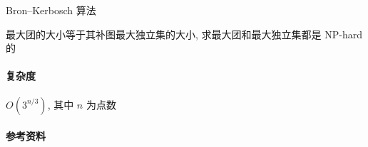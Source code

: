 Bron--Kerbosch 算法

最大团的大小等于其补图最大独立集的大小, 求最大团和最大独立集都是 NP-hard 的

\paragraph{复杂度} \(O\left(3^{n/3}\right)\), 其中 \(n\) 为点数

\paragraph{参考资料} \cite{enwiki:1209826174}
